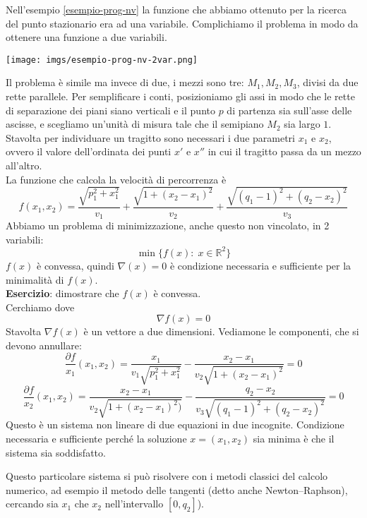 \begin{example} Nell'esempio \ref{esempio-prog-nv} la funzione che
abbiamo ottenuto per la ricerca del punto stazionario era ad una
variabile. Complichiamo il problema in modo da ottenere una funzione a
due variabili.

\centerline{\texttt{[image: imgs/esempio-prog-nv-2var.png]}}

Il problema \`e simile ma invece di due, i mezzi sono tre: $M_1, M_2,
M_3$, divisi da due rette parallele. Per semplificare i conti,
posizioniamo gli assi in modo che le rette di separazione dei piani
siano verticali e il punto $p$ di partenza sia sull'asse delle
ascisse, e scegliamo un'unit\`a di misura tale che il semipiano $M_2$
sia largo $1$.\\ Stavolta per individuare un tragitto sono necessari i
due parametri $x_1$ e $x_2$, ovvero il valore dell'ordinata dei punti
$x'$ e $x''$ in cui il tragitto passa da un mezzo all'altro.\\ La
funzione che calcola la velocit\`a di percorrenza \`e $$f(x_1, x_2) =
\frac{\sqrt{p_1^2 + x_1^2}}{v_1} + \frac{\sqrt{1+ (x_2 - x_1)^2}}{v_2}
+ \frac{\sqrt{(q_1 -1)^2 + (q_2 - x_2)^2}}{v_3}$$ Abbiamo un problema
di minimizzazione, anche questo non vincolato, in 2 variabili: $$
\min\{f(x):\; x \in \mathbb{R}^2\}$$ $f(x)$ \`e convessa, quindi
$\nabla(x) = 0$ \`e condizione necessaria e sufficiente per la
minimalit\`a di $f(x)$.\\ \textbf{Esercizio}: dimostrare che $f(x)$ \`e
convessa. \\ Cerchiamo dove $$\nabla f(x) = 0$$ Stavolta $\nabla f(x)$
\`e un vettore a due dimensioni. Vediamone le componenti, che si devono
annullare:\\
$$\frac{\partial f}{x_1}(x_1,x_2) =  \frac{x_1}{v_1 \sqrt{p_1^2+ x_1^2}} - \frac{x_2 - x_1}{v_2 \sqrt{1+(x_2 - x_1)^2}} = 0$$
$$\frac{\partial f}{x_2}(x_1,x_2) =  \frac{x_2-x_1}{v_2 \sqrt{1+( x_2-x_1)^2)}} - \frac{q_2 -x_2}{v_3  \sqrt{(q_1-1)^2 + (q_2 -x_2)^2}} = 0$$
Questo \`e un sistema non lineare di due equazioni in due
incognite. Condizione necessaria e sufficiente perch\'e la soluzione
$x=(x_1,x_2)$ sia minima \`e che il sistema sia soddisfatto.

Questo particolare sistema si può risolvere con i metodi classici del
calcolo numerico, ad esempio il metodo delle tangenti (detto anche
Newton--Raphson), cercando sia $x_1$ che $x_2$ nell'intervallo
$[0,q_2]$).
\end{example}

